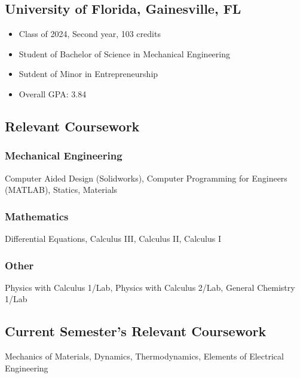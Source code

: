\documentclass{article}
\newcommand\halftextbox[1]{%
  \parbox[t]{.475\textwidth}{#1}%
}
\newcommand\spacetextbox[1]{%
  \parbox{.05\textwidth}{#1}%
}
\newenvironment{CustomItemize}
{ \begin{itemize}[leftmargin=1em]
    \setlength{\itemsep}{0pt}
    \setlength{\parskip}{0pt}
    \setlength{\parindent}{0pt}
    \setlength{\parsep}{0pt}     }
{ \end{itemize}                  }
\begin{document}
\noindent
\halftextbox{
\begin{raggedright}
\subsection{University of Florida,  Gainesville, FL}
\begin{CustomItemize}
\item Class of 2024, Second year, 103 credits
\item Student of Bachelor of Science in Mechanical Engineering
\item Sutdent of Minor in Entrepreneurship
\item Overall GPA: 3.84
\end{CustomItemize}

\subsection{Relevant Coursework}
\subsubsection{Mechanical Engineering}
Computer Aided Design (Solidworks),
Computer Programming for Engineers (MATLAB),
Statics,
Materials
\end{raggedright}
}
\spacetextbox{\hfil\hfil}
\halftextbox{
\begin{raggedright}
\subsubsection{Mathematics}
Differential Equations, 
Calculus III,
Calculus II,
Calculus I

\subsubsection{Other}
Physics with Calculus 1/Lab, 
Physics with Calculus 2/Lab, 
General Chemistry 1/Lab

\subsection{Current Semester's Relevant Coursework}
Mechanics of Materials,
Dynamics,
Thermodynamics,
Elements of Electrical Engineering
\end{raggedright}
}
\end{document}
